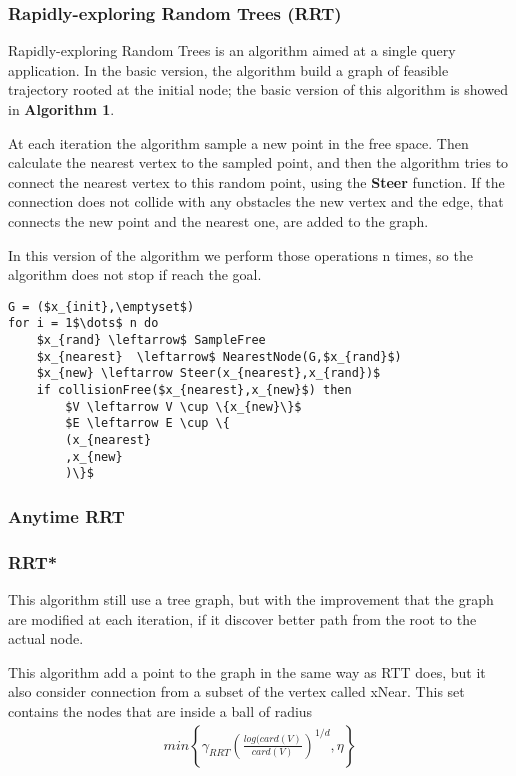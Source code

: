 \documentclass[10pt]{article}
\begin{document}
	\subsubsection{Rapidly-exploring Random Trees (RRT)}
	
	Rapidly-exploring Random Trees is an algorithm aimed at a single query application. In the basic version, the algorithm build a graph of feasible trajectory rooted at the initial node; the basic version of this algorithm is showed in \textbf{Algorithm 1}.
	
	At each iteration the algorithm sample a new point in the free space. Then calculate the nearest vertex to the sampled point, and then the algorithm tries to connect the nearest vertex to this random point, using the \textbf{Steer} function. If the connection does not collide with any obstacles the new vertex  and the edge, that connects the new point and the nearest one, are added to the graph.
	
		
	In this version of the algorithm we perform those operations n times, so the algorithm does not stop if reach the goal.
	\begin{lstlisting}[frame=single, mathescape=true,caption={RRT}]
G = ($x_{init},\emptyset$)
for i = 1$\dots$ n do
	$x_{rand} \leftarrow$ SampleFree
	$x_{nearest}  \leftarrow$ NearestNode(G,$x_{rand}$)
	$x_{new} \leftarrow Steer(x_{nearest},x_{rand})$	
	if collisionFree($x_{nearest},x_{new}$) then
		$V \leftarrow V \cup \{x_{new}\}$
		$E \leftarrow E \cup \{
		(x_{nearest}
		,x_{new}
		)\}$
	\end{lstlisting}
	
	\subsubsection{Anytime RRT}
	\subsubsection{RRT*}
	
	This algorithm still use a tree graph, but with the improvement that the graph are modified at each iteration, if it discover better path from the root to the actual node.
	
	This algorithm add a point to the graph in the same way as RTT does, but it also consider connection from a subset of the vertex called xNear. This set contains the nodes that are inside a ball of radius 
	\begin{align}
		 min\left\{\gamma_{RRT}\left(\frac{log(card(V)}{card(V)}\right)^{1/d},\eta\right\}
		\nonumber
	\end{align}
	
\end{document}

